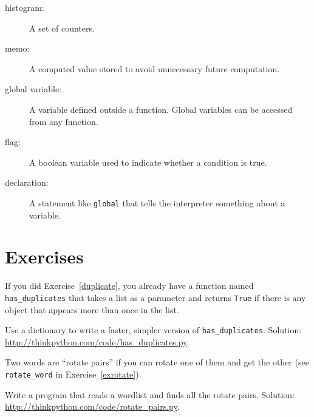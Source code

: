 \documentclass[10pt]{book}
\begin{document}
\begin{description}
\item[histogram:] A set of counters.

\item[memo:] A computed value stored to avoid unnecessary future
computation.

\item[global variable:]  A variable defined outside a function.  Global
variables can be accessed from any function.

\item[flag:] A boolean variable used to indicate whether a condition
is true.

\item[declaration:] A statement like {\tt global} that tells the
interpreter something about a variable.

\end{description}

\section{Exercises}

\begin{exercise}

If you did Exercise~\ref{duplicate}, you already have
a function named \verb"has_duplicates" that takes a list
as a parameter and returns {\tt True} if there is any object
that appears more than once in the list.

Use a dictionary to write a faster, simpler version of
\verb"has_duplicates".
Solution: \url{http://thinkpython.com/code/has_duplicates.py}.

\end{exercise}


\begin{exercise}
\label{exrotatepairs}

Two words are ``rotate pairs'' if you can rotate one of them
and get the other (see \verb"rotate_word" in Exercise~\ref{exrotate}).

Write a program that reads a wordlist and finds all the rotate
pairs.  Solution: \url{http://thinkpython.com/code/rotate_pairs.py}.

\end{exercise}
\end{document}
